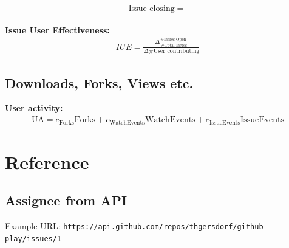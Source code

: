 \documentclass[a4paper,10pt]{article}
\begin{document}
\begin{align}
 \text{Issue closing} = \frac{}{}
\end{align}


\textbf{Issue User Effectiveness:} 
\begin{align}
 IUE = \frac{\Delta \frac{\text{\# Issues Open }}{\text{\# Total Issues}}}{\Delta\text{\# User contributing}}
\end{align}



\subsection{Downloads, Forks, Views etc.}
\textbf{User activity:}
\begin{align}
 \text{UA} = c_{\text{Forks}}\text{Forks} + c_{\text{WatchEvents}} \text{WatchEvents} + c_{\text{IssueEvents}} \text{IssueEvents}
\end{align}




\section{Reference}
\subsection{Assignee from API}
Example URL: \texttt{https://api.github.com/repos/thgersdorf/github-play/issues/1}
\end{document}
